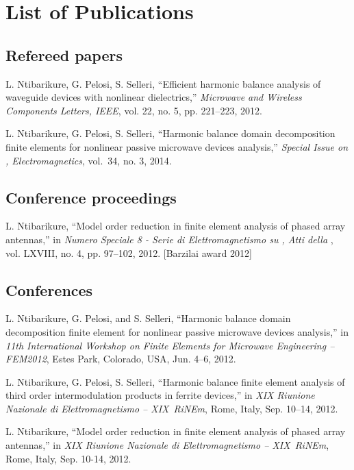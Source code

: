 \chapter*{List of Publications}%
\section*{Refereed papers}
\begin{enumerate}[label={[\arabic*]}]
\item L. Ntibarikure, G. Pelosi, S. Selleri, ``Efficient harmonic balance analysis of waveguide devices with nonlinear dielectrics,'' \emph{Microwave and Wireless Components Letters, IEEE}, vol. 22, no. 5, pp. 221--223, 2012.
\item L. Ntibarikure, G. Pelosi, S. Selleri, ``Harmonic balance domain decomposition finite elements for nonlinear passive microwave devices analysis,'' \emph{Special Issue on , Electromagnetics}, vol.~34, no. 3, 2014.
\end{enumerate}

\section*{Conference proceedings}
\begin{enumerate}[label={[\arabic*]}]
\item L. Ntibarikure, ``Model order reduction in finite element analysis of phased array antennas,'' in \emph{Numero Speciale 8 - Serie di Elettromagnetismo su , Atti della }, vol. LXVIII, no. 4, pp. 97--102, 2012. [Barzilai award 2012]
\end{enumerate}


\section*{Conferences}
\begin{enumerate}[label={[\arabic*]}]
\item L. Ntibarikure, G. Pelosi, and S. Selleri, ``Harmonic balance domain decomposition finite element for nonlinear passive microwave devices analysis,'' in \emph{11th International Workshop on Finite Elements for Microwave Engineering -- FEM2012}, Estes Park, Colorado, USA, Jun. 4--6, 2012.
\item L. Ntibarikure, G. Pelosi, S. Selleri, ``Harmonic balance finite element analysis of third order intermodulation products in ferrite devices,'' in \emph{XIX Riunione Nazionale di Elettromagnetismo -- XIX~RiNEm}, Rome, Italy, Sep. 10--14, 2012.
\item L. Ntibarikure, ``Model order reduction in finite element analysis of phased array antennas,'' in \emph{XIX Riunione Nazionale di Elettromagnetismo -- XIX~RiNEm}, Rome, Italy, Sep. 10-14, 2012.
\end{enumerate}
